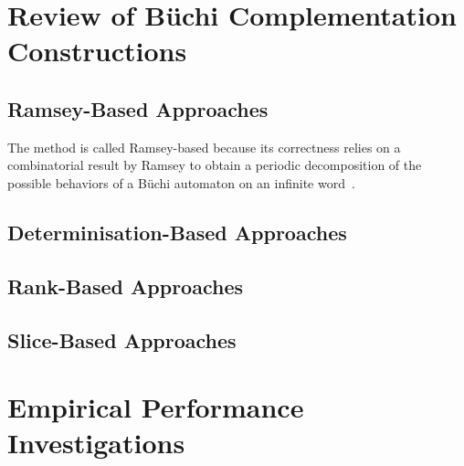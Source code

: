 \section{Review of Büchi Complementation Constructions}
\label{review}
\subsection{Ramsey-Based Approaches}
\label{ramsey-based}
The method is called Ramsey-based because its correctness relies on a combinatorial result by Ramsey to obtain a periodic decomposition of the possible behaviors of a Büchi automaton on an infinite word~\cite{2012_breuers}.

\subsection{Determinisation-Based Approaches}
\label{det-based}
\subsection{Rank-Based Approaches}
\label{rank-based}
\subsection{Slice-Based Approaches}
\label{slice-based}

\section{Empirical Performance Investigations}